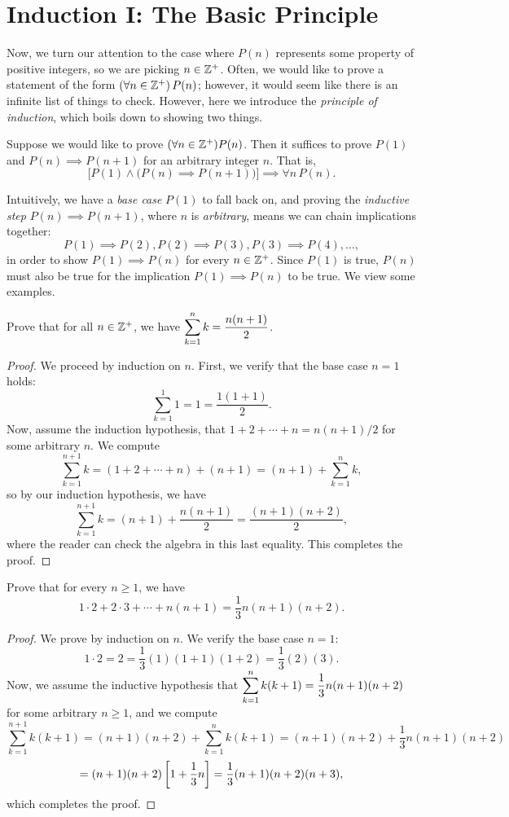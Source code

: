 \documentclass{article}
\begin{document}
\section{Induction I: The Basic Principle}
Now, we turn our attention to the case where $P(n)$ represents some property of positive integers, so we are picking $n\in \mathbb Z^+$. Often, we would like to prove a statement of the form $(\forall n\in\mathbb Z^+)\, P(n)$; however, it would seem like there is an infinite list of things to check. However, here we introduce the \textit{principle of induction}, which boils down to showing two things.
\begin{theorem}
Suppose we would like to prove $(\forall n\in\mathbb Z^+) P(n)$. Then it suffices to prove $P(1)$ and $P(n) \implies P(n+1)$ for an arbitrary integer $n$. That is,
$$\Big[P(1) \land \big(P(n)\implies P(n+1)\big)\Big] \implies \forall n\, P(n).$$
\end{theorem}
Intuitively, we have a \textit{base case} $P(1)$ to fall back on, and proving the \textit{inductive step} $P(n)\implies P(n+1)$, where $n$ is \textit{arbitrary}, means we can chain implications together:
$$P(1) \implies P(2), P(2)\implies P(3), P(3)\implies P(4), \ldots,$$
in order to show $P(1) \implies P(n)$ for every $n\in\mathbb Z^+$. Since $P(1)$ is true, $P(n)$ must also be true for the implication $P(1)\implies P(n)$ to be true. We view some examples.  
\begin{example}
Prove that for all $n\in\mathbb Z^+$, we have $\displaystyle\sum_{k=1}^n k = \frac{n(n+1)}2$.
\end{example}
\begin{proof}
We proceed by induction on $n$. First, we verify that the base case $n=1$ holds: \newpage
$$\sum_{k=1}^1 1 = 1 = \frac{1(1+1)}2.$$
Now, assume the induction hypothesis, that $1+2+ \cdots + n = n(n+1)/2$ for some arbitrary $n$. We compute
$$\sum_{k=1}^{n+1}k = (1 + 2 + \cdots + n) + (n+1) = (n+1) +\sum_{k=1}^n k,$$
so by our induction hypothesis, we have
$$\sum_{k=1}^{n+1} k = (n+1) + \frac{n(n+1)}2 = \frac{(n+1)(n+2)}2,$$
where the reader can check the algebra in this last equality. This completes the proof.
\end{proof}
\begin{example}
Prove that for every $n\geq 1$, we have
$$1\cdot 2 + 2\cdot 3 + \cdots + n(n+1) = \frac 13n (n+1)(n+2).$$
\end{example}
\begin{proof}
We prove by induction on $n$. We verify the base case $n=1$:
$$1\cdot 2 = 2 =  \frac 13(1)(1+1)(1+2) = \frac 13 (2)(3).$$
Now, we assume the inductive hypothesis that $\displaystyle\sum_{k=1}^n k(k+1) = \frac 13n(n+1)(n+2)$ for some arbitrary $n\geq 1$, and we compute
$$\sum_{k=1}^{n+1}k(k+1) = (n+1)(n+2) + \sum_{k=1}^n k(k+1) = (n+1)(n+2) + \frac 13n(n+1)(n+2)$$
$$=(n+1)(n+2)\left[1 + \frac 13n\right] = \frac 13(n+1) (n+2) (n+3),$$
which completes the proof.
\end{proof}
\end{document}

